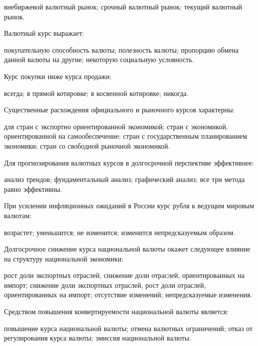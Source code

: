 \documentclass[12pt, table]{exam}
\begin{document}
\begin{questions}
\begin{multicols}{2}
\begin{choices}
	 \CC внебиржевой валютный рынок;
	 \choice срочный валютный рынок;
	 \choice текущий валютный рынок.
	 \end{choices}
\question Валютный курс выражает:
	 \begin{choices}
	 \choice покупательную способность валюты;
	 \choice полезность валюты;
	 \CC пропорцию обмена данной валюты на другие;
	 \choice некоторую социальную условность.
	 \end{choices}
\question Курс покупки ниже курса продажи:
	 \begin{choices}
	 \choice всегда;
	 \CC в прямой котировке;
	 \choice в косвенной котировке;
	 \choice никогда.
	 \end{choices}
\question Существенные расхождения официального и рыночного курсов характерны:
	 \begin{choices}
	 \choice для стран с экспортно ориентированной экономикой;
	 \choice стран с экономикой, ориентированной на самообеспечение;
	 \CC стран с государственным планированием экономики;
	 \choice стран со свободной рыночной экономикой.
	 \end{choices}
\question Для прогнозирования валютных курсов в долгосрочной перспективе эффективнее:
	 \begin{choices}
	 \choice анализ трендов;
	 \CC фундаментальный анализ;
	 \choice графический анализ;
	 \choice все три метода равно эффективны.
	 \end{choices}
\question При усилении инфляционных ожиданий в России курс рубля к ведущим мировым валютам:
	 \begin{choices}
	 \choice возрастет;
	 \CC уменьшится;
	 \choice не изменится;
	 \choice изменится непредсказуемым образом.
	 \end{choices}
\question Долгосрочное снижение курса национальной валюты окажет следующее влияние на структуру национальной экономики:
	 \begin{choices}
	 \CC рост доли экспортных отраслей, снижение доли отраслей, ориентированных на импорт;
	 \choice снижение доли экспортных отраслей, рост доли отраслей, ориентированных на импорт;
	 \choice отсутствие изменений;
	 \choice непредсказуемые изменения.
	 \end{choices}
\question Средством повышения конвертируемости национальной валюты является:
	 \begin{choices}
	 \choice повышение курса национальной валюты;
	 \CC отмена валютных ограничений;
	 \choice отказ от регулирования курса валюты;
	 \choice эмиссия национальной валюты.
	 \end{choices}



\end{multicols}
\end{questions}
\end{document}
